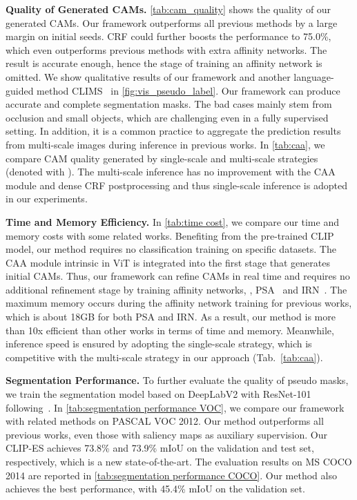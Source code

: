 \documentclass[10pt,twocolumn,letterpaper]{article}
\begin{document}
\textbf{Quality of Generated CAMs.} \cref{tab:cam_quality} shows the quality of our generated CAMs. 
Our framework outperforms all previous methods by a large margin on initial seeds. CRF could 
further boosts the performance to 75.0\%, which even outperforms previous methods with extra affinity networks. The result is accurate enough, hence the stage of training an affinity network is omitted. We show qualitative results of our framework and another language-guided method CLIMS~\cite{Xie_2022_CLIMS} in \cref{fig:vis_pseudo_label}. Our framework can produce accurate and complete segmentation masks. The bad cases mainly stem from occlusion and small objects, which are challenging even in a fully supervised setting. In addition, it is a common practice to aggregate the prediction results from multi-scale images during inference in previous works. In \cref{tab:caa}, we compare CAM quality generated by single-scale and multi-scale strategies (denoted with ). The multi-scale inference has no improvement with the CAA module and dense CRF postprocessing and thus single-scale inference is adopted in our experiments.

\textbf{Time and Memory Efficiency.} In \cref{tab:time cost}, we compare our time and memory costs with some related works. Benefiting from the pre-trained CLIP model, our method requires no classification training on specific datasets. The CAA module intrinsic in ViT is integrated into the first stage that generates initial CAMs. Thus, our framework can refine CAMs in real time and requires no additional refinement stage by training affinity networks, \eg, PSA~\cite{Ahn2018PSA} and IRN~\cite{Ahn2019IRN}. The maximum memory occurs during the affinity network training for previous works, which is about 18GB for both PSA and IRN. As a result, our method is more than 10x efficient than other works in terms of time and memory. Meanwhile, inference speed is ensured by adopting the single-scale strategy, which is competitive with the multi-scale strategy in our approach (Tab.~\ref{tab:caa}). 

\textbf{Segmentation Performance.} To further evaluate the quality of pseudo masks, we train the segmentation model based on DeepLabV2 with ResNet-101 following~\cite{Chen2020bes,Chen_2022_CVPR_SIPE,Xie_2022_CLIMS}. In \cref{tab:segmentation performance VOC}, we compare our framework with related methods on PASCAL VOC 2012. Our method outperforms all previous works, even those with saliency maps as auxiliary supervision. Our CLIP-ES achieves 73.8\% and 73.9\% mIoU on the validation and test set, respectively, which is a new state-of-the-art. The evaluation results on MS COCO 2014 are reported in \cref{tab:segmentation performance COCO}. Our method also achieves the best performance, with 45.4\% mIoU on the validation set.
\end{document}
